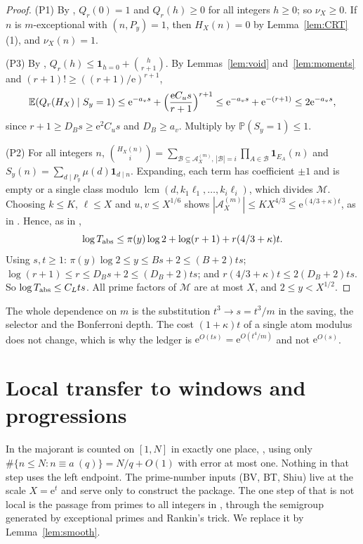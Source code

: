 \documentclass[10pt,reqno]{amsart}
\theoremstyle{definition}
\newcommand{\A}{\mathcal A}
\newcommand{\M}{\mathcal M}
\newcommand{\E}{\mathbb E}
\newcommand{\Prob}{\mathbb P}
\newcommand{\ind}{\mathbf 1}
\newcommand{\lcm}{\operatorname{lcm}}
\newcommand{\e}{\mathrm e}
\newcommand{\Tabs}{T_{\rm abs}}
\begin{document}
\begin{proof}
(P1) By \cite[Lemma~8.1]{TQ}, $Q_r(0)=1$ and $Q_r(h)\geq0$ for all
integers $h\geq0$; so $\nu_X\geq0$.  If $n$ is $m$-exceptional with
$(n,P_y)=1$, then $H_X(n)=0$ by Lemma~\ref{lem:CRT}(1), and
$\nu_X(n)=1$.

(P3) By \cite[Lemma~8.1]{TQ}, $Q_r(h)\leq\ind_{h=0}+\binom h{r+1}$.  By
Lemmas~\ref{lem:void} and~\ref{lem:moments} and $(r+1)!\geq((r+1)/\e)^{r+1}$,
\[
 \E(Q_r(H_X)\mid S_y=1)\leq\e^{-a_vs}+\Bigl(\frac{\e C_us}{r+1}\Bigr)^{r+1}
 \leq\e^{-a_vs}+\e^{-(r+1)}\leq2\e^{-a_vs},
\]
since $r+1\geq D_Bs\geq\e^2C_us$ and $D_B\geq a_v$.  Multiply by
$\Prob(S_y=1)\leq1$.

(P2) For all integers $n$,
$\binom{H_X(n)}i=\sum_{\mathcal B\subseteq\A^{(m)}_X,\,|\mathcal B|=i}\prod_{A\in\mathcal B}\ind_{E_A}(n)$
and $S_y(n)=\sum_{d\mid P_y}\mu(d)\ind_{d\mid n}$.  Expanding, each term
has coefficient $\pm1$ and is empty or a single class modulo
$\lcm(d,k_1\ell_1,\ldots,k_i\ell_i)$, which divides $\M$.  Choosing
$k\leq K$, $\ell\leq X$ and $u,v\leq X^{1/6}$ shows
$|\A^{(m)}_X|\leq KX^{4/3}\leq\e^{(4/3+\kappa)t}$, as in \cite[(48)]{TQ}.
Hence, as in \cite[(49)]{TQ},
\[
 \log\Tabs\leq\pi(y)\log2+\log(r+1)+r(4/3+\kappa)t.
\]
Using $s,t\geq1$: $\pi(y)\log2\leq y\leq Bs+2\leq(B+2)ts$;
$\log(r+1)\leq r\leq D_Bs+2\leq(D_B+2)ts$; and
$r(4/3+\kappa)t\leq2(D_B+2)ts$.  So $\log\Tabs\leq C_Lts$.  All prime
factors of $\M$ are at most $X$, and $2\leq y<X^{1/2}$.
\end{proof}

The whole dependence on $m$ is the substitution $t^3\to s=t^3/m$ in the
saving, the selector and the Bonferroni depth.  The cost $(1+\kappa)t$ of
a single atom modulus does not change, which is why the ledger is
$\e^{O(ts)}=\e^{O(t^4/m)}$ and not $\e^{O(s)}$.

\section{Local transfer to windows and progressions}\label{sec:transfer}
In \cite{TQ} the majorant is counted on $[1,N]$ in exactly one place,
\cite[(50)]{TQ}, using only
$\#\{n\leq N:n\equiv a\ (q)\}=N/q+O(1)$ with error at most one.  Nothing
in that step uses the left endpoint.  The prime-number inputs (BV, BT,
Shiu) live at the scale $X=\e^t$ and serve only to construct the
package.  The one step of \cite{TQ} that is not local is the passage from
primes to all integers in \cite[\S9]{TQ}, through the semigroup generated
by exceptional primes and Rankin's trick.  We replace it by
Lemma~\ref{lem:smooth}.
\end{document}

